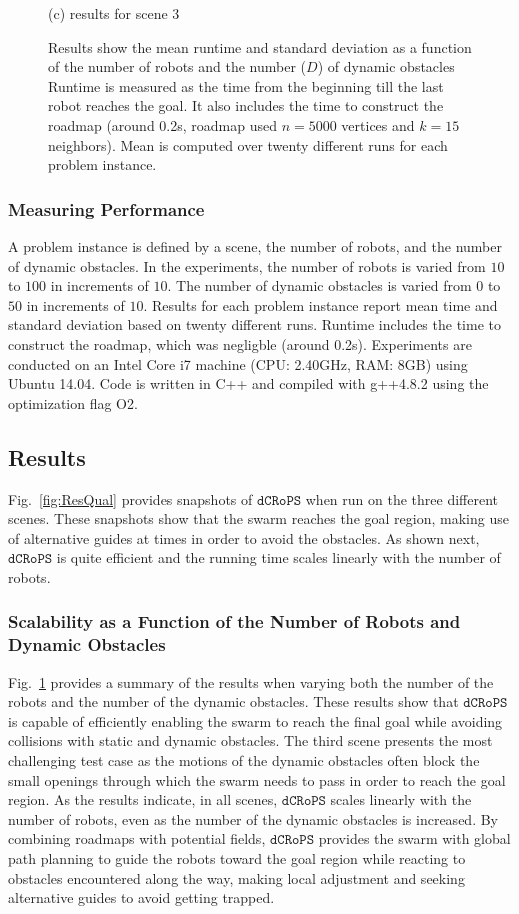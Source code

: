 \documentclass[letterpaper, 10pt, conference]{ieeeconf}
\newcommand{\Acronym}[1]{\ensuremath{{{\texttt{#1}}}}}
\newcommand{\Name}{\Acronym{dCRoPS}}
\begin{document}
\begin{figure}
(c) results for scene 3
\caption{Results show the mean runtime and standard deviation as a
  function of the number of robots and the number ($D$) of dynamic obstacles
  Runtime is measured as the time
  from the beginning till the last robot reaches the goal. It also
  includes the time to construct the roadmap (around 0.2s, roadmap
  used $n=5000$ vertices and $k=15$ neighbors). Mean is
  computed over twenty different runs for each problem instance. }
\label{fig:Res1}
\end{figure}




\subsubsection{Measuring Performance}
A problem instance is defined by a scene, the number of robots, and
the number of dynamic obstacles. In the experiments, the number of
robots is varied from $10$ to $100$ in increments of $10$. The number
of dynamic obstacles is varied from $0$ to $50$ in increments of
$10$.  Results for each
problem instance report mean time and standard deviation based on
twenty different runs. Runtime includes the time to construct the
roadmap, which was negligble (around 0.2s).  Experiments are conducted on an
Intel Core i7 machine (CPU: 2.40GHz, RAM: 8GB) using Ubuntu 14.04. Code is
written in C++ and compiled with g++4.8.2 using the optimization flag O2.

\subsection{Results}
\label{sec:Results}

Fig.~\ref{fig:ResQual} provides snapshots of $\Name$ when run on the
three different scenes. These snapshots show that the swarm reaches
the goal region, making use of alternative guides at times in order to
avoid the obstacles. As shown next, $\Name$ is quite efficient and the
running time scales linearly with the number of robots.

\subsubsection{Scalability as a Function of the Number of Robots and Dynamic
  Obstacles} Fig.~\ref{fig:Res1} provides a summary of the results
when varying both the number of the robots and the number of the
dynamic obstacles.  These results show that $\Name$ is capable of
efficiently enabling the swarm to reach the final goal while avoiding
collisions with static and dynamic obstacles. The third scene presents
the most challenging test case as the motions of the dynamic obstacles
often block the small openings through which the swarm needs to pass
in order to reach the goal region. As the results indicate, in all
scenes, $\Name$ scales linearly with the number of robots, even as the
number of the dynamic obstacles is increased.  By combining roadmaps
with potential fields, $\Name$ provides the swarm with global path
planning to guide the robots toward the goal region while reacting to
obstacles encountered along the way, making local adjustment and
seeking alternative guides to avoid getting trapped.
\end{document}

